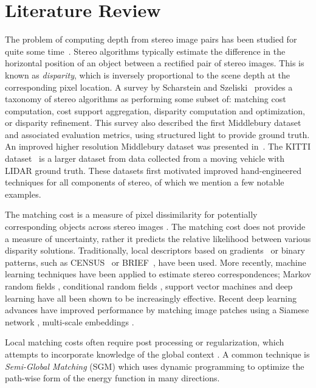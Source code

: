 \section{Literature Review}
\label{stereo_literature}

The problem of computing depth from stereo image pairs has been studied for quite some time~\citep{Barnard1982}. Stereo algorithms typically estimate the difference in the horizontal position of an object between a rectified pair of stereo images. This is known as \textit{disparity}, which is inversely proportional to the scene depth at the corresponding pixel location. A survey by Scharstein and Szeliski~\citep{scharstein2002taxonomy} provides a taxonomy of stereo algorithms as performing some subset of: matching cost computation, cost support aggregation, disparity computation and optimization, or disparity refinement. This survey also described the first Middlebury dataset and associated evaluation metrics, using structured light to provide ground truth.  
An improved higher resolution Middlebury dataset was presented in~\citep{Scharstein2014}. 
The KITTI dataset~\citep{Geiger2012CVPR,Menze2015CVPR} is a larger dataset from data collected from a moving vehicle with LIDAR ground truth. These datasets first motivated improved hand-engineered techniques for all components of stereo, of which we mention a few notable examples.

The matching cost is a measure of pixel dissimilarity for potentially corresponding objects across stereo images \citep{Hirschmuller2007}. The matching cost does not provide a measure of uncertainty, rather it predicts the relative likelihood between various disparity solutions. Traditionally, local descriptors based on gradients~\citep{geiger2010efficient} or binary patterns, such as CENSUS~\citep{Zabih1994} or BRIEF~\citep{Calonder2010,Heise2015}, have been used. More recently, machine learning techniques have been applied to estimate stereo correspondences; Markov random fields \citep{Zhang2007}, conditional random fields \citep{Scharstein2007}, support vector machines \citep{Li2008} and deep learning \citep{zbontar2015computing,Zagoruyko2015} have all been shown to be increasingly effective. Recent deep learning advances have improved performance by matching image patches using a Siamese network \citep{luo2016efficient}, multi-scale embeddings \citep{chen2015deep}.

Local matching costs often require post processing or regularization, which attempts to incorporate knowledge of the global context \citep{Kolmogorov2001,Klaus2006,Bleyer2011}. A common technique is \emph{Semi-Global Matching} (SGM) \citep{Hirschmuller2008} which uses dynamic programming to optimize the path-wise form of the energy function in many directions.

